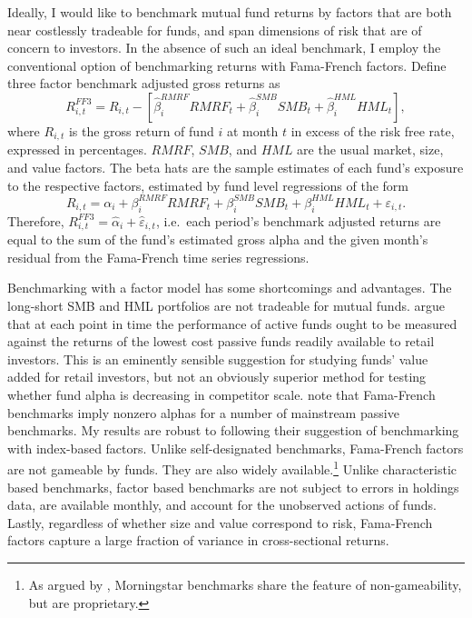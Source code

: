 \documentclass[openany]{book}
\let\rmarkdownfootnote\footnote%
\def\footnote{\protect\rmarkdownfootnote}
\theoremstyle{definition}
\theoremstyle{definition}
\theoremstyle{definition}
\theoremstyle{remark}
\begin{document}
Ideally, I would like to benchmark mutual fund returns by factors that
are both near costlessly tradeable for funds, and span dimensions of
risk that are of concern to investors. In the absence of such an ideal
benchmark, I employ the conventional option of benchmarking returns with
Fama-French factors. Define three factor benchmark adjusted gross
returns as \begin{equation}
R^{FF3}_{i,t} = R_{i,t} - \left[ \hat{\beta}^{RMRF}_i RMRF_t + \hat{\beta}^{SMB}_i SMB_t + \hat{\beta}^{HML}_i HML_t \right],
\end{equation} where \(R_{i,t}\) is the gross return of fund \(i\) at
month \(t\) in excess of the risk free rate, expressed in percentages.
\(RMRF\), \(SMB\), and \(HML\) are the usual market, size, and value
factors. The beta hats are the sample estimates of each fund's exposure
to the respective factors, estimated by fund level regressions of the
form \begin{equation}
R_{i,t} = \alpha_i + \beta^{RMRF}_i RMRF_t + \beta^{SMB}_i SMB_t + \beta^{HML}_i HML_t + \varepsilon_{i,t}.
\end{equation} Therefore,
\(R^{FF3}_{i,t} = \hat{\alpha}_i + \hat{\varepsilon}_{i,t}\), i.e.~each
period's benchmark adjusted returns are equal to the sum of the fund's
estimated gross alpha and the given month's residual from the
Fama-French time series regressions.

Benchmarking with a factor model has some shortcomings and advantages.
The long-short SMB and HML portfolios are not tradeable for mutual
funds. \citet{bvb15} argue that at each point in time the performance of
active funds ought to be measured against the returns of the lowest cost
passive funds readily available to retail investors. This is an
eminently sensible suggestion for studying funds' value added for retail
investors, but not an obviously superior method for testing whether fund
alpha is decreasing in competitor scale. \citet{cpz12} note that
Fama-French benchmarks imply nonzero alphas for a number of mainstream
passive benchmarks. My results are robust to following their suggestion
of benchmarking with index-based factors. Unlike self-designated
benchmarks, Fama-French factors are not gameable by funds. They are also
widely available.\footnote{As argued by \citet{pst15}, Morningstar
  benchmarks share the feature of non-gameability, but are proprietary.}
Unlike characteristic based benchmarks, factor based benchmarks are not
subject to errors in holdings data, are available monthly, and account
for the unobserved actions of funds. Lastly, regardless of whether size
and value correspond to risk, Fama-French factors capture a large
fraction of variance in cross-sectional returns.
\end{document}
